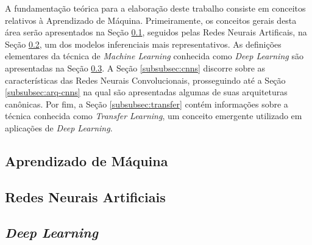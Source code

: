A fundamentação teórica para a elaboração deste trabalho consiste em conceitos relativos à Aprendizado de Máquina. Primeiramente, os conceitos gerais desta área serão apresentados na Seção \ref{subsec:ml}, seguidos pelas Redes Neurais Artificais, na Seção \ref{subsec:rna}, um dos modelos inferenciais mais representativos.
As definições elementares da técnica de \emph{Machine Learning} conhecida como \emph{Deep Learning} são apresentadas na Seção \ref{subsec:dl}. A Seção \ref{subsubsec:cnns} discorre sobre as características das Redes Neurais Convolucionais, prosseguindo até a Seção \ref{subsubsec:arq-cnns} na qual são apresentadas algumas de suas arquiteturas canônicas. Por fim, a Seção \ref{subsubsec:transfer} contém informações sobre a técnica conhecida como \emph{Transfer Learning}, um conceito emergente utilizado em aplicações de \emph{Deep Learning}.



\subsection{Aprendizado de Máquina}
\label{subsec:ml}


\subsection{Redes Neurais Artificiais}
\label{subsec:rna}


\subsection{\emph{Deep Learning}}
\label{subsec:dl}

